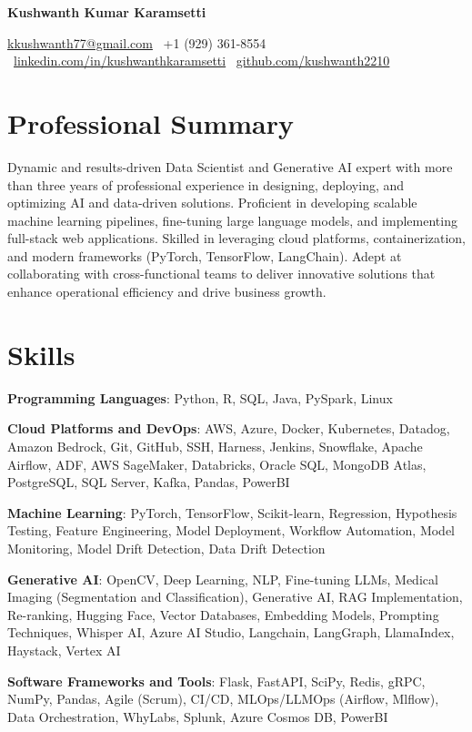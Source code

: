 \documentclass[10pt]{article}
\newcommand{\namesection}[1]{%
  \begin{center}
    {\LARGE \textbf{#1}}
  \end{center}
}
\begin{document}
\sloppy

\namesection{Kushwanth Kumar Karamsetti}
\begin{center}
{\small \href{mailto:kkushwanth77@gmail.com}{kkushwanth77@gmail.com} \textbullet\ +1 (929) 361-8554 \textbullet\ \href{https://linkedin.com/in/kushwanthkaramsetti}{linkedin.com/in/kushwanthkaramsetti} \textbullet\ \href{https://github.com/kushwanth2210}{github.com/kushwanth2210}}
\end{center}

\section*{Professional Summary}
Dynamic and results-driven Data Scientist and Generative AI expert with more than three years of professional experience in designing, deploying, and optimizing AI and data-driven solutions. Proficient in developing scalable machine learning pipelines, fine-tuning large language models, and implementing full-stack web applications. Skilled in leveraging cloud platforms, containerization, and modern frameworks (PyTorch, TensorFlow, LangChain). Adept at collaborating with cross-functional teams to deliver innovative solutions that enhance operational efficiency and drive business growth.

\section*{Skills}
\textbf{Programming Languages}: Python, R, SQL, Java, PySpark, Linux\par
\textbf{Cloud Platforms and DevOps}: AWS, Azure, Docker, Kubernetes, Datadog, Amazon Bedrock, Git, GitHub, SSH, Harness, Jenkins, Snowflake, Apache Airflow, ADF, AWS SageMaker, Databricks, Oracle SQL, MongoDB Atlas, PostgreSQL, SQL Server, Kafka, Pandas, PowerBI\par
\textbf{Machine Learning}: PyTorch, TensorFlow, Scikit-learn, Regression, Hypothesis Testing, Feature Engineering, Model Deployment, Workflow Automation, Model Monitoring, Model Drift Detection, Data Drift Detection\par
\textbf{Generative AI}: OpenCV, Deep Learning, NLP, Fine-tuning LLMs, Medical Imaging (Segmentation and Classification), Generative AI, RAG Implementation, Re-ranking, Hugging Face, Vector Databases, Embedding Models, Prompting Techniques, Whisper AI, Azure AI Studio, Langchain, LangGraph, LlamaIndex, Haystack, Vertex AI\par
\textbf{Software Frameworks and Tools}: Flask, FastAPI, SciPy, Redis, gRPC, NumPy, Pandas, Agile (Scrum), CI/CD, MLOps/LLMOps (Airflow, Mlflow), Data Orchestration, WhyLabs, Splunk, Azure Cosmos DB, PowerBI\par
\end{document}
